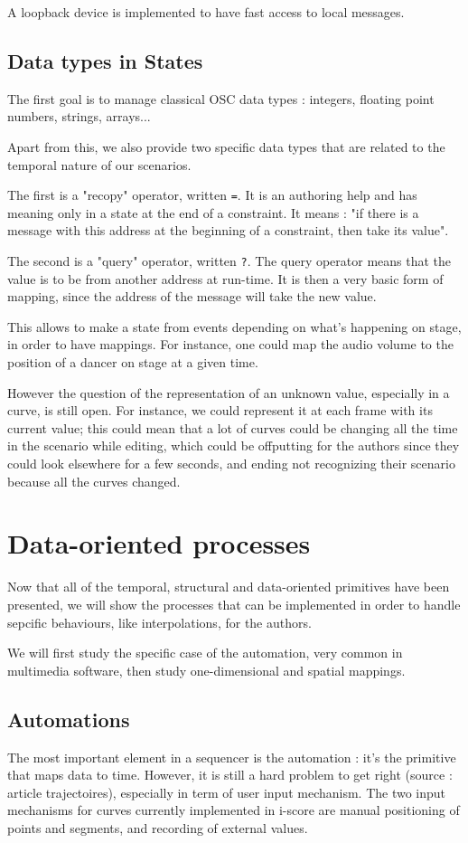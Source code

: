 \documentclass{sigchi}
\begin{document}
A loopback device is implemented to have fast access to local messages.

\subsection{Data types in States}
The first goal is to manage classical OSC data types : integers, floating point numbers, strings, arrays...

Apart from this, we also provide two specific data types that are related to the temporal nature of our scenarios.

The first is a "recopy" operator, written \texttt{=}. It is an authoring help and has meaning only in a state at the end of a constraint. It means : "if there is a message with this address at the beginning of a constraint, then take its value".

The second is a "query" operator, written \texttt{?}. The query operator means that the value is to be from another address at run-time. It is then a very basic form of mapping, since the address of the message will take the new value.

This allows to make a state from events depending on what's happening on stage, in order to have mappings. For instance, one could map the audio volume to the position of a dancer on stage at a given time.

However the question of the representation of an unknown value, especially in a curve, is still open. For instance, we could represent it at each frame with its current value; this could mean that a lot of curves could be changing all the time in the scenario while editing, which could be offputting for the authors since they could look elsewhere for a few seconds, and ending not recognizing their scenario because all the curves changed. 


\section{Data-oriented processes}
Now that all of the temporal, structural and data-oriented primitives have been presented, we will show the processes that can be implemented in order to handle sepcific behaviours, like interpolations, for the authors.

We will first study the specific case of the automation, very common in multimedia software, then study one-dimensional and spatial mappings.
\subsection{Automations}
The most important element in a sequencer is the automation : it's the primitive that maps data to time. However, it is still a hard problem to get right (source : article trajectoires), especially in term of user input mechanism. The two input mechanisms for curves currently implemented in i-score are manual positioning of points and segments, and recording of external values. 
\end{document}
